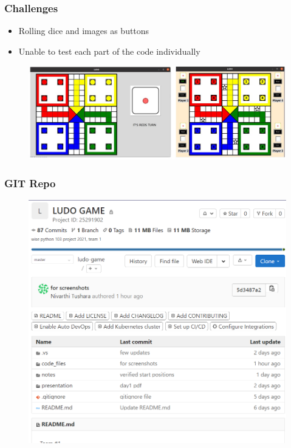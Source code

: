 \documentclass[15pt]{beamer}
\begin{document}
\begin{frame}
\begin {itemize}
	    \end{itemize}
    \end{frame}

    \begin{frame}
	    \frametitle{Challenges}
	    \begin{itemize}
	      
              \item Rolling dice and images as buttons
	      \item Unable to test each part of the code individually
		\end{itemize}

		      \begin{figure}
		      \includegraphics[width=1\linewidth]{dice.jpeg}
                          
		      \end{figure}
		
    \end{frame}

    
	
        


    \begin{frame}
    \frametitle{GIT Repo}
    \begin{figure}
	    \includegraphics[width=0.9\linewidth]{final_repo.png}
	    
    \end{figure}
    \end{frame}
\end{document}
